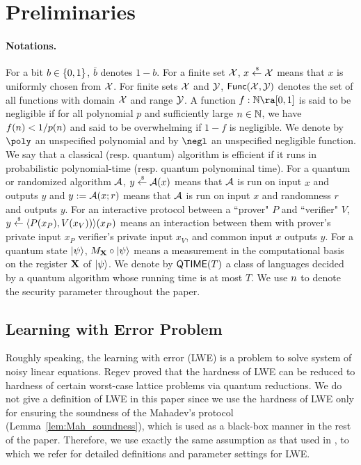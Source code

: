 \section{Preliminaries}
\paragraph{Notations.}
For a bit $b\in\{0,1\}$, $\bar{b}$ denotes $1-b$.
For a finite set $\mathcal{X}$, $x\overset{\hspace{0.1em}\mathsf{\scriptscriptstyle\$}}{\leftarrow} \mathcal{X}$ means that $x$ is uniformly chosen from $\mathcal{X}$.
For finite sets $\mathcal{X}$ and $\mathcal{Y}$, $\mathsf{Func}(\mathcal{X},\mathcal{Y})$ denotes the set of all functions with domain $\mathcal{X}$ and range $\mathcal{Y}$.
A function $f:\mathbb{N}\ra [0,1]$ is said to be negligible if for all polynomial $p$ and sufficiently large $n \in \mathbb{N}$, we have $f(n)< 1/p(n)$ and said to be overwhelming if $1-f$ is negligible.
We denote by $\poly$ an unspecified polynomial and by $\negl$ an unspecified negligible function.
We say that a classical (resp. quantum) algorithm is efficient if it runs in probabilistic polynomial-time (resp. quantum polynominal time).
For a quantum or randomized algorithm $\mathcal{A}$, $y\overset{\hspace{0.1em}\mathsf{\scriptscriptstyle\$}}{\leftarrow} \mathcal{A}(x)$ means that $\mathcal{A}$ is run on input $x$ and outputs $y$ and $y := \mathcal{A}(x;r)$  means that $\mathcal{A}$ is run on input $x$ and randomness $r$ and outputs $y$. 
For an interactive protocol between a ``prover" $P$ and ``verifier" $V$, $y\overset{\hspace{0.1em}\mathsf{\scriptscriptstyle\$}}{\leftarrow} \langle P(x_P),V(x_V)) \rangle(x_P)$ means an interaction between them with prover's private input $x_P$ verifier's private input $x_V$, and common input $x$ outputs $y$.
For a quantum state $\ket{\psi}$, $M_{\mathbf{X}}\circ \ket{\psi}$ means a measurement in the computational basis on the register $\mathbf{X}$ of $\ket{\psi}$.
We denote by $\mathsf{QTIME}(T)$ a class of languages decided by a quantum algorithm whose running time is at most $T$.
We use $n$ to denote the security parameter throughout the paper.

\subsection{Learning with Error Problem}
Roughly speaking, the learning with error (LWE) is a problem to solve system of noisy linear equations.
Regev \cite{JACM:Regev09} proved that the hardness of LWE can be reduced to hardness of certain worst-case lattice problems via quantum reductions.
We do not give a definition of LWE in this paper since we use the hardness of LWE only for ensuring the soundness of the Mahadev's protocol (Lemma~\ref{lem:Mah_soundness}), which is used as a black-box manner in the rest of the paper.
Therefore, we use exactly the same assumption as that used in \cite{FOCS:Mahadev18a}, to which we refer for detailed definitions and parameter settings for LWE.

